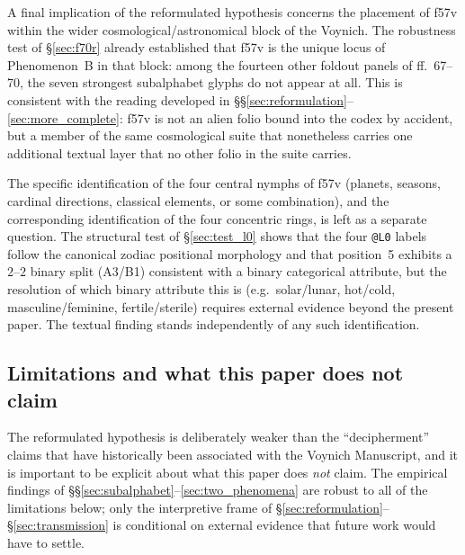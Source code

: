 A final implication of the reformulated hypothesis concerns the placement
of f57v within the wider cosmological/astronomical block of the Voynich.
The robustness test of \S\ref{sec:f70r} already established that f57v is
the unique locus of Phenomenon~B in that block: among the fourteen other
foldout panels of ff.~67--70, the seven strongest subalphabet glyphs do
not appear at all. This is consistent with the reading developed in
\S\S\ref{sec:reformulation}--\ref{sec:more_complete}: f57v is not an
alien folio bound into the codex by accident, but a member of the same
cosmological suite that nonetheless carries one additional textual layer
that no other folio in the suite carries.

The specific identification of the four central nymphs of f57v
(planets, seasons, cardinal directions, classical elements, or some
combination), and the corresponding identification of the four concentric
rings, is left as a separate question. The structural test of
\S\ref{sec:test_l0} shows that the four \texttt{@L0} labels follow the
canonical zodiac positional morphology and that position~5 exhibits a
$2$--$2$ binary split (A3/B1) consistent with a binary categorical
attribute, but the resolution of which binary attribute this is (e.g.\
solar/lunar, hot/cold, masculine/feminine, fertile/sterile) requires
external evidence beyond the present paper. The textual finding stands
independently of any such identification.

\subsection{Limitations and what this paper does not claim}
\label{sec:limitations}

The reformulated hypothesis is deliberately weaker than the
``decipherment'' claims that have historically been associated with
the Voynich Manuscript, and it is important to be explicit about
what this paper does \emph{not} claim. The empirical findings of
\S\S\ref{sec:subalphabet}--\ref{sec:two_phenomena} are robust to all
of the limitations below; only the interpretive frame of
\S\ref{sec:reformulation}--\S\ref{sec:transmission} is conditional on
external evidence that future work would have to settle.

